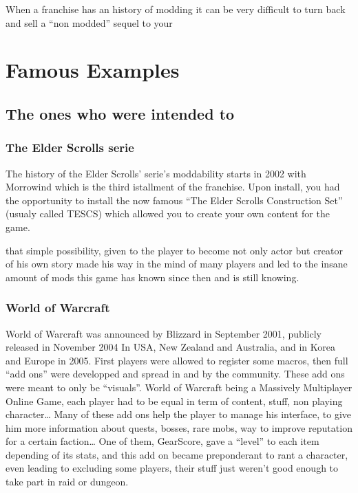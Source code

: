 \documentclass[a4paper,11pt]{article}
\begin{document}
When a franchise has an history of modding it can be very difficult to turn back and sell a “non modded” sequel to your 

\section{Famous Examples}

\subsection{The ones who were intended to}

\subsubsection{The Elder Scrolls serie}

The history of the Elder Scrolls’ serie’s moddability starts in 2002 with Morrowind which is the third istallment of the franchise. Upon install, you had the opportunity to install the now famous “The Elder Scrolls Construction Set” (usualy called TESCS) which allowed you to create your own content for the game. 

that simple possibility, given to the player to become not only actor but creator of his own story made his way in the mind of many players and led to the insane amount of mods this game has known since then and is still knowing. 


\subsubsection{World of Warcraft}

World of Warcraft was announced by Blizzard in September 2001, publicly released in November 2004 In USA, New Zealand and Australia, and in Korea and Europe in 2005. First players were allowed to register some macros, then full “add ons” were developped and spread in and by the community. These add ons were meant to only be “visuals”. World of Warcraft being a Massively Multiplayer Online Game, each player had to be equal in term of content, stuff, non playing character…
Many of these add ons help the player to manage his interface, to give him more information about quests, bosses, rare mobs, way to improve reputation for a certain faction… One of them, GearScore, gave a “level” to each item depending of its stats, and this add on became preponderant to rant a character, even leading to excluding some players, their stuff just weren’t good enough to take part in raid or dungeon.
\end{document}
